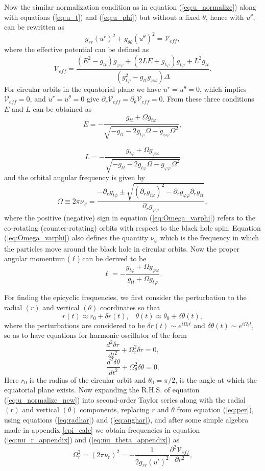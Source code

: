 \documentclass[12pt,a4paper,oneside]{book}
\newcommand{\eq}[2]{\begin{equation} \label{eq:#1} #2 \end{equation}}
\newcommand{\Eref}[1]{(\ref{eq:#1})}
\begin{document}
Now the similar normalization condition as in equation \Eref{u_normalize} along with equations \Eref{u_t} and \Eref{u_phi} but without a fixed $\theta$, hence with $u^\theta$, can be rewritten as 
\eq{u_normalize_new}{g_{rr}\left(u^r\right)^2+g_{\theta\theta}\left(u^\theta\right)^2 = \mathcal{V}_{eff},}
where the effective potential can be defined as
\eq{effective_potential_new}{\mathcal{V}_{eff} = \frac{\left(E^2-g_{tt}\right)g_{\varphi\varphi}+\left(2LE+g_{t\varphi}\right)g_{t\varphi}+L^2g_{tt}}{\left(g_{t\varphi}^2-g_{tt}g_{\varphi\varphi}\right)\Delta}.}
For circular orbits in the equatorial plane we have $u^r = u^\theta = 0$, which implies $\mathcal{V}_{eff} = 0$, and $\dot{u}^r = \dot{u}^\theta = 0$ give $\partial_r\mathcal{V}_{eff} = \partial_\theta\mathcal{V}_{eff} = 0$. From these 
three conditions $E$ and $L$ can be obtained as \cite{c_Bambi_12}
\eq{}{E = -\frac{g_{tt}+\Omega g_{t\varphi}}{\sqrt{-g_{tt}-2g_{t\varphi}\Omega-g_{\varphi\varphi}\Omega^2}},}

\eq{}{L = -\frac{g_{t\varphi}+\Omega g_{\varphi\varphi}}{\sqrt{-g_{tt}-2g_{t\varphi}\Omega-g_{\varphi\varphi}\Omega^2}}}
and the orbital angular frequency is given by \cite{c_Bambi_12}
\eq{Omega_varphi}{\Omega\equiv2\pi\nu_\varphi = \frac{-\partial_r g_{t\phi}\pm\sqrt{\left( \partial_rg_{t\varphi}\right)^2 - \partial_rg_{\varphi\varphi}\partial_rg_{tt}}}{\partial_rg_{\varphi\varphi}},}
where the positive (negative) sign in equation \Eref{Omega_varphi} refers to the co-rotating (counter-rotating) orbits with respect to the black hole spin. Equation 
\Eref{Omega_varphi} also defines the quantity $\nu_\varphi$ which is the frequency in which the particles move around the black hole in circular orbits.
Now the proper angular momentum ($\ell$) can be derived to be
\eq{curly_l}{\ell = -\frac{g_{t\varphi}+\Omega g_{\varphi\varphi}}{g_{tt}+\Omega g_{t\varphi}}.}

For finding the epicyclic frequencies, we first consider the perturbation to the radial $(r)$ and vertical $(\theta)$ 
coordinates so that \eq{per}{r(t)\approx r_0+\delta r(t)\text{,}\quad\theta(t)\approx \theta_0+\delta\theta(t),}
where the perturbations are considered to be $\delta r(t)\sim e^{i\Omega_rt}$ and $\delta\theta(t) \sim e^{i\Omega_\theta t}$, so as to have equations for harmonic oscillator of the form
\eq{radhar}{\frac{d^2\delta r}{dt^2} +\Omega_r^2\delta r = 0,}
\eq{anghar}{\frac{d^2\delta \theta}{dt^2} + \Omega_\theta^2\delta\theta = 0.}
Here  $r_0$ is the radius of the circular orbit and $\theta_0 = \pi/2$, is the angle at which the equatorial plane exists.
Now expanding the R.H.S. of equation \Eref{u_normalize_new} into second-order Taylor series along with the radial $(r)$ and vertical $(\theta)$ components,
replacing $r$ and $\theta$ from equation \Eref{per}, using equations \Eref{radhar} and \Eref{anghar}, 
and after some simple algebra made in appendix \ref{epi_calc} we obtain frequencies in equation \Eref{nu_r_appendix} and \Eref{nu_theta_appendix} as \cite{c_Bambi_12,Ryan}
\eq{nu_r}{\Omega_r^2 =\left(2\pi\nu_r\right)^2=- \frac{1}{2g_{rr}(u^t)^2}\frac{\partial^2\mathcal{V}_{eff}}{\partial r^2},}
\end{document}
